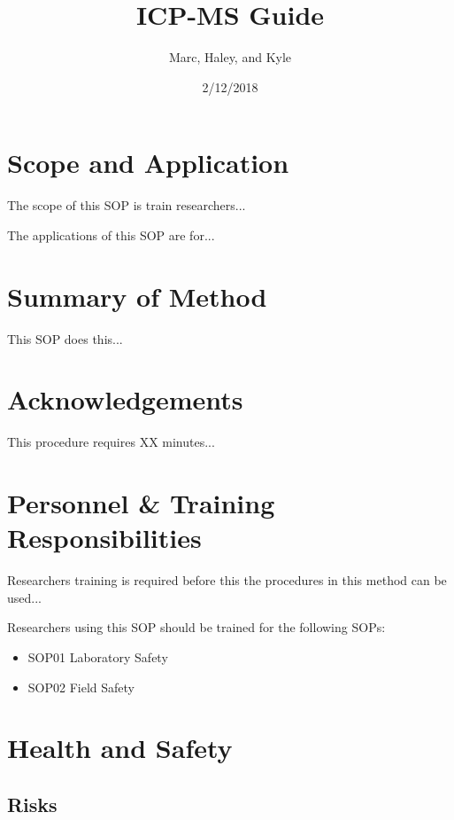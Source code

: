\documentclass[12pt]{../SOP4_alpha}\usepackage[]{graphicx}\usepackage[]{color}
\title{ICP-MS Guide}
\date{2/12/2018}
\author{Marc, Haley, and Kyle}
\begin{document}
\maketitle

\section{Scope and Application}

\NP The scope of this SOP is train researchers...

\NP The applications of this SOP are for...

\section{Summary of Method}

\NP This SOP does this...

\tableofcontents

\newpage

\section{Acknowledgements}


\NP This procedure requires XX minutes...

\section{Personnel \& Training Responsibilities}

\NP Researchers training is required before this the procedures in this method can be used... 

\NP Researchers using this SOP should be trained for the following SOPs:

\begin{itemize}
  \item SOP01 Laboratory Safety
  \item SOP02 Field Safety
\end{itemize}

\section{Health and Safety}

\subsection{Risks}
\end{document}
